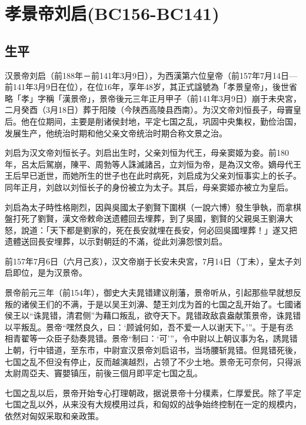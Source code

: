 
\section{孝景帝刘启\tiny(BC156-BC141)}

\subsection{生平}

汉景帝刘启（前188年－前141年3月9日），为西漢第六位皇帝（前157年7月14日—前141年3月9日在位），在位16年，享年48岁，其正式諡號為「孝景皇帝」，後世省略「孝」字稱「漢景帝」，景帝後元三年正月甲子（前141年3月9日）崩于未央宮，二月癸酉（3月18日）葬于阳陵（今陕西高陵县西南）。为汉文帝刘恒長子，母竇皇后。他在位期间，主要是削诸侯封地，平定七国之乱，巩固中央集权，勤俭治国，发展生产，他统治时期和他父亲文帝统治时期合称文景之治。

刘启为汉文帝刘恒长子。刘启出生时，父亲刘恒为代王，母亲窦姬为妾。前180年，呂太后駕崩，陳平、周勃等人誅滅諸呂，立刘恒为帝，是為汉文帝。嫡母代王王后早已逝世，而她所生的世子也在此时病死，刘启成为父亲刘恒事实上的长子。同年正月，刘啟以刘恒长子的身份被立为太子。其后，母亲窦姬亦被立为皇后。

刘启為太子時性格剛烈，因與吳國太子劉賢下圍棋（一說六博）發生爭執，而拿棋盤打死了劉賢，漢文帝敕命送遗體回去埋葬，到了吳國，劉賢的父親吳王劉濞大怒，說道：「天下都是劉家的，死在長安就埋在長安，何必回吳國埋葬！」遂又把遗體送回長安埋葬，以示對朝廷的不滿，從此刘濞怨恨刘启。

前157年7月6日（六月己亥），汉文帝崩于长安未央宮，7月14日（丁未），皇太子刘启即位，是为汉景帝。

景帝前元三年（前154年），御史大夫晁错建议削藩，景帝听从，引起那些早就想反叛的诸侯王们的不满，于是以吴王刘濞、楚王刘戊为首的七国之乱开始了。七國诸侯王以“诛晁错，清君侧”为藉口叛乱，欲夺天下。晁错政敌袁盎献策景帝，诛晁错以平叛乱。景帝“嘿然良久，曰：‘顾诚何如，吾不爱一人以谢天下。’”。于是有丞相青翟等一众臣子劾奏晁错。景帝“制曰：‘可’”，令中尉以上朝议事为名，誘晁错上朝，行中错道，至东市，中尉宣汉景帝刘启诏书，当场腰斩晁错。但晁错死後，七国之乱不但没有停止，反而越演越烈，占领了不少土地。景帝无可奈何，只得派太尉周亞夫、竇嬰镇压，前後三個月即平定七国之乱。

七国之乱以后，景帝开始专心打理朝政，据说景帝十分樸素，仁厚爱民。除了平定七国之乱以外，从来没有大规模用过兵，和匈奴的战争始终控制在一定的规模内，依然对匈奴采取和亲政策。

